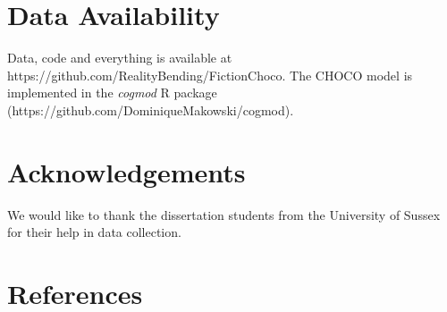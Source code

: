 \documentclass[
  jou,
  floatsintext,
  longtable,
  nolmodern,
  notxfonts,
  notimes,
  colorlinks=true,linkcolor=blue,citecolor=blue,urlcolor=blue]{apa7}
\begin{document}
\section{Data Availability}\label{data-availability}

Data, code and everything is available at
https://github.com/RealityBending/FictionChoco. The CHOCO model is
implemented in the \emph{cogmod} R package
(https://github.com/DominiqueMakowski/cogmod).

\section{Acknowledgements}\label{acknowledgements}

We would like to thank the dissertation students from the University of
Sussex for their help in data collection.

\section{References}\label{references}
\end{document}
